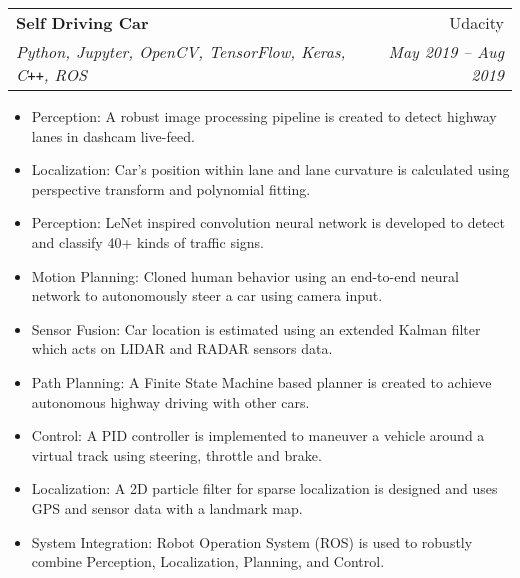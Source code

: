 \documentclass[letterpaper,10pt]{article}
\makeatletter
\newcommand{\resumeHeading}[4]{
  \vspace{-1pt}
    \begin{tabular*}{0.97\textwidth}{l@{\extracolsep{\fill}}r}
      \textbf{#1} & #2 \vspace{-2pt}\\ \vspace{1pt}
      \textit{\small#3} & \textit{\small #4} \\
    \end{tabular*}
}
\newcommand{\resumeItemListStart}{
\vspace{-7pt}
\begin{itemize}[leftmargin=14pt]
}
\newcommand{\resumeItemListEnd}{
\vspace{+7pt}
\end{itemize}
}
\newcommand{\resumeItem}[1]{
  \item\small{
      {#1 \vspace{-7pt}
      }
  }
}
\makeatother
\begin{document}
	\resumeHeading{Self Driving Car}{Udacity}{Python, Jupyter, OpenCV, TensorFlow, Keras, C\texttt{++}, ROS}{May 2019 -- Aug 2019}
	\resumeItemListStart
	\resumeItem{Perception: A robust image processing pipeline is created to detect highway lanes in dashcam live-feed.}
	\resumeItem{Localization: Car's position within lane and lane curvature is calculated using perspective transform and polynomial fitting.}
	\resumeItem{Perception: LeNet inspired convolution neural network is developed to detect and classify 40+ kinds of traffic signs.}
	\resumeItem{Motion Planning: Cloned human behavior using an end-to-end neural network to autonomously steer a car using camera input.}
	\resumeItem{Sensor Fusion: Car location is estimated using an extended Kalman filter which acts on LIDAR and RADAR sensors data.}
	\resumeItem{Path Planning: A Finite State Machine based planner is created to achieve autonomous highway driving with other cars.}
	\resumeItem{Control: A PID controller is implemented to maneuver a vehicle around a virtual track using steering, throttle and brake.}
	\resumeItem{Localization: A 2D particle filter for sparse localization is designed and uses GPS and sensor data with a landmark map.}
	\resumeItem{System Integration: Robot Operation System (ROS) is used to robustly combine Perception, Localization, Planning, and Control.}
	\resumeItemListEnd
	
	
	
\end{document}
